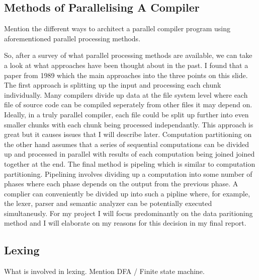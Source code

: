 \subsection{Methods of Parallelising A Compiler} \label{compiler_parallel_methods}
\begin{sectionplan}
    Mention the different ways to architect a parallel compiler program using
aforementioned parallel processing methods.
\end{sectionplan}

\begin{roughwork}

	So, after a survey of what parallel processing methods are available, we can
	take a look at what approaches have been thought about in the past. I found
	that a paper from 1989 which the main approaches into the three points on this
	slide. The first approach is splitting up the input and processing each chunk
	individually. Many compilers divide up data at the file system level where each
	file of source code can be compiled seperately from other files it may depend
	on. Ideally, in a truly parallel compiler, each file could be split up further
	into even smaller chunks with each chunk being processed independantly. This
	approach is great but it causes issues that I will describe later. Computation
	partitioning on the other hand assumes that a series of sequential computations
	can be divided up and processed in parallel with results of each computation
	being joined joined together at the end. The final method is pipeling which
	is similar to computation partitioning. Pipelining involves dividing up a
	computation into some number of phases where each phase depends on the output
	from the previous phase. A complier can conveniently be divided up into such
	a pipline where, for example, the lexer, parser and semantic analyzer can be
	potentially executed simultaneusly. For my project I will focus predominantly on
	the data paritioning method and I will elaborate on my reasons for this decision
	in my final report.

\end{roughwork}

\subsection{Lexing}
\begin{sectionplan}
    What is involved in lexing. Mention DFA / Finite state machine.
\end{sectionplan}

